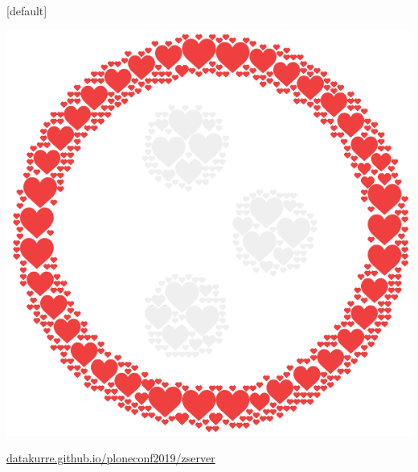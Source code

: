 \documentclass[12pt,aspectratio=169]{beamer}
\begin{document}

[default]
\begin{frame}[standout]
\vfill
\includegraphics[height=0.50\paperheight]{images/plone-icon-hearts.png}
\par
\href{https://datakurre.github.io/ploneconf2019/zserver}{datakurre.github.io/ploneconf2019/zserver}
\end{frame}

\end{document}
